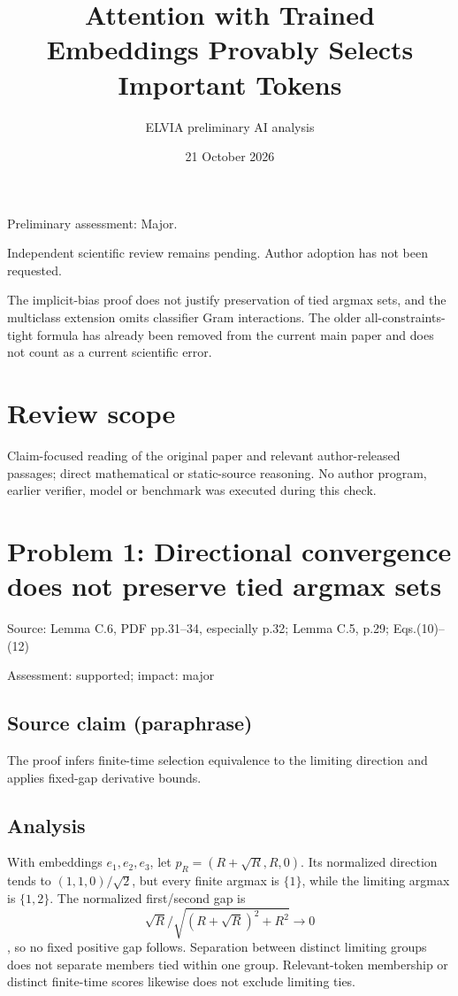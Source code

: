 \documentclass[11pt]{article}
\begin{document}
\title{Attention with Trained Embeddings Provably Selects Important Tokens}

\author{ELVIA preliminary AI analysis}\date{21 October 2026}\maketitle

Preliminary assessment: Major.\par

Independent scientific review remains pending. Author adoption has not been requested.

The implicit-bias proof does not justify preservation of tied argmax sets, and the multiclass extension omits classifier Gram interactions. The older all-constraints-tight formula has already been removed from the current main paper and does not count as a current scientific error.

\section*{Review scope}

Claim-focused reading of the original paper and relevant author-released passages; direct mathematical or static-source reasoning. No author program, earlier verifier, model or benchmark was executed during this check.

\section*{Problem 1: Directional convergence does not preserve tied argmax sets}

Source: Lemma C.6, PDF pp.31–34, especially p.32; Lemma C.5, p.29; Eqs.(10)–(12)

Assessment: supported; impact: major

\subsection*{Source claim (paraphrase)}

The proof infers finite-time selection equivalence to the limiting direction and applies fixed-gap derivative bounds.

\subsection*{Analysis}

With embeddings \(e_1,e_2,e_3\), let \(p_R=(R+\sqrt R,R,0)\). Its normalized direction tends to \((1,1,0)/\sqrt2\), but every finite argmax is \(\{1\}\), while the limiting argmax is \(\{1,2\}\). The normalized first/second gap is \[\sqrt R/\sqrt{(R+\sqrt R)^2+R^2}\to0\], so no fixed positive gap follows. Separation between distinct limiting groups does not separate members tied within one group. Relevant-token membership or distinct finite-time scores likewise does not exclude limiting ties.
\end{document}
